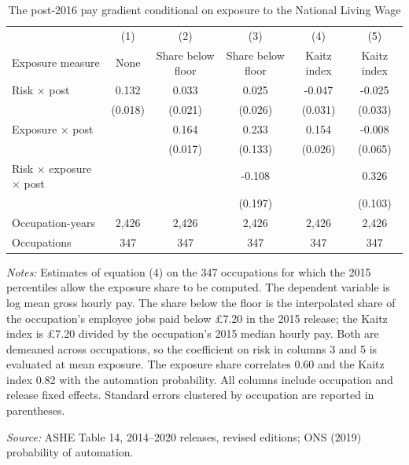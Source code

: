 \begin{table}[!ht]\centering
\caption{The post-2016 pay gradient conditional on exposure to the National Living Wage}\label{tab:nlw}
\begin{threeparttable}\footnotesize\setlength{\tabcolsep}{4pt}
\begin{tabular}{lccccc}\toprule
 & (1) & (2) & (3) & (4) & (5) \\
Exposure measure & None & Share below floor & Share below floor & Kaitz index & Kaitz index \\ \midrule
Risk $\times$ post & 0.132 & 0.033 & 0.025 & -0.047 & -0.025 \\
 & (0.018) & (0.021) & (0.026) & (0.031) & (0.033) \\
Exposure $\times$ post &  & 0.164 & 0.233 & 0.154 & -0.008 \\
 &  & (0.017) & (0.133) & (0.026) & (0.065) \\
Risk $\times$ exposure $\times$ post &  &  & -0.108 &  & 0.326 \\
 &  &  & (0.197) &  & (0.103) \\ \addlinespace
Occupation-years & 2,426 & 2,426 & 2,426 & 2,426 & 2,426 \\
Occupations & 347 & 347 & 347 & 347 & 347 \\
\bottomrule\end{tabular}
\begin{tablenotes}\footnotesize
\item \emph{Notes:} Estimates of equation (4) on the 347 occupations for which the 2015 percentiles allow the exposure share to be computed. The dependent variable is log mean gross hourly pay. The share below the floor is the interpolated share of the occupation's employee jobs paid below \pounds 7.20 in the 2015 release; the Kaitz index is \pounds 7.20 divided by the occupation's 2015 median hourly pay. Both are demeaned across occupations, so the coefficient on risk in columns 3 and 5 is evaluated at mean exposure. The exposure share correlates 0.60 and the Kaitz index 0.82 with the automation probability. All columns include occupation and release fixed effects. Standard errors clustered by occupation are reported in parentheses.
\item \emph{Source:} ASHE Table 14, 2014--2020 releases, revised editions; ONS (2019) probability of automation.
\end{tablenotes}\end{threeparttable}\end{table}